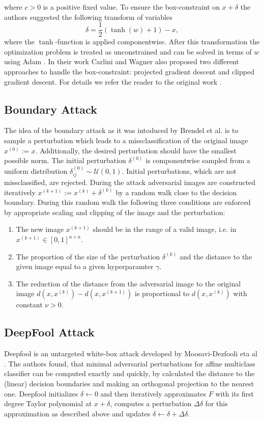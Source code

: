 \documentclass{article}
\begin{document}
where $c>0$ is a positive fixed value. To ensure the box-constraint on $x+\delta$ the authors suggested the following transform of variables 
\begin{equation}
	\delta = \frac{1}{2}(\tanh(w)+1)-x,
\end{equation} 
where the $\tanh$-function is applied componentwise. After this transformation the optimization problem is treated as unconstrained and can be solved in terms of $w$ using Adam \cite{adam}. In their work Carlini and Wagner also proposed two different approaches to handle the box-constraint: projected gradient descent and clipped gradient descent. For details we refer the reader to the original work \cite{carlini}.

\subsection{Boundary Attack}

The idea of the boundary attack as it was intoduced by Brendel et al. \cite{boundary} is to sample a perturbation which leads to a missclassification of the original image $x^{(0)}:=x$. Additionally, the desired perturbation should have the smallest possible norm. The initial perturbation $\delta^{(0)}$ is componentwise sampled from a uniform distribution $\delta^{(0)}_{ij}\sim \mathcal{U}(0,1)$. Initial perturbations, which are not missclassified, are rejected. During the attack adversarial images are constructed iteratively $x^{(k+1)}:= x^{(k)}+\delta^{(k)}$ by a random walk close to the decision boundary. During this random walk the following three conditions are enforced by appropriate scaling and clipping of the image and the perturbation:
\begin{enumerate}
	\item The new image $x^{(k+1)}$ should be in the range of a valid image, i.e. in $x^{(k+1)}\in [0,1]^{n\times n}$.
	\item The proportion of the size of the perturbation $\delta^{(k)}$ and the distance to the given image equal to a given hyperparamter $\gamma$.
	\item The reduction of the distance from the adversarial image to the original image $d(x, x^{(k)})-d(x, x^{(k+1)})$ is proportional to $d(x, x^{(k)})$ with constant $\nu>0$.
\end{enumerate}


\subsection{DeepFool Attack}
Deepfool is an untargeted white-box attack developed by Moosavi-Dezfooli eta al \cite{deepfool}.
The authors found, that minimal adversarial perturbations for affine multiclass classifier can be computed exactly and quickly,
by calculated the distance to the (linear) decision boundaries and making an orthogonal projection to the nearest one.
Deepfool initializes $\delta \gets 0$ and then iteratively approximates $F$ with its first degree Taylor polynomial at $x + \delta$, computes a perturbation $\Delta \delta$ for this approximation as described above and updates $\delta \gets \delta + \Delta \delta$.
\end{document}
